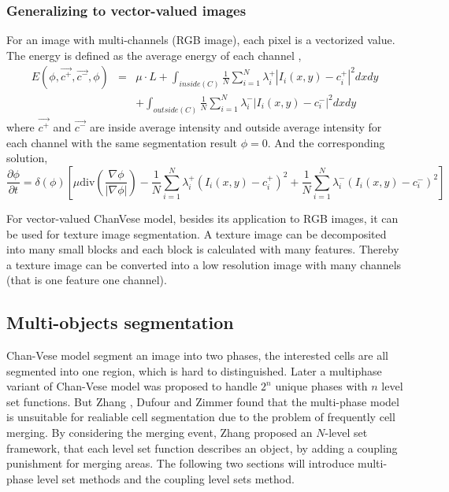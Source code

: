 \subsubsection{Generalizing to vector-valued images}
For an image with multi-channels (RGB image), each pixel is a vectorized value. The energy is defined as the average energy of each channel \cite{chan2000active},
\begin{eqnarray}
\nonumber
E(\phi,\vec{c^+}, \vec{c^-},\phi) & = &\mu\cdot L + \int_{inside( C)} \frac{1}{N}\sum_{i=1}^N\lambda_i^+|I_i(x,y)-c_i^+|^2dxdy \\
& & + \int_{outside(C )}\frac{1}{N}\sum_{i=1}^N\lambda_i^-|I_i(x,y)-c_i^-|^2dxdy
\end{eqnarray}
where $\vec{c^+}$ and $\vec{c^-}$ are inside average intensity and outside average intensity for each channel with the same segmentation result $\phi = 0$. And the corresponding solution,
\begin{equation}
\frac{\partial \phi}{\partial t} = \delta(\phi)\left[\mu\mbox{div}\left(\frac{\nabla\phi}{|\nabla\phi|}\right) -\frac{1}{N}\sum_{i=1}^N\lambda_i^+(I_i(x,y)-c_i^+)^2 + \frac{1}{N}\sum_{i=1}^N\lambda_i^-(I_i(x,y)-c_i^-)^2\right]
\end{equation}

For vector-valued ChanVese model, besides its application to RGB images, it can be used for texture image segmentation. A texture image can be decomposited into many small blocks and each block is calculated with many features. Thereby a texture image can be converted into a low resolution image with many channels (that is one feature one channel).

\subsection{Multi-objects segmentation}
Chan-Vese model segment an image into two phases, the interested cells are all segmented into one region, which is hard to distinguished. Later a multiphase variant of Chan-Vese model was proposed to handle $2^n$ unique phases with $n$ level set functions. But Zhang \cite{zhang2004tracking}, Dufour \cite{dufour2005segmenting} and Zimmer \cite{zimmer2005coupled} found that the multi-phase model is unsuitable for realiable cell segmentation due to the problem of frequently cell merging. By considering the merging event, Zhang \cite{zhang2004tracking} proposed an $N$-level set framework, that each level set function describes an object, by adding a coupling punishment for merging areas. The following two sections will introduce multi-phase level set methods and the coupling level sets method.

